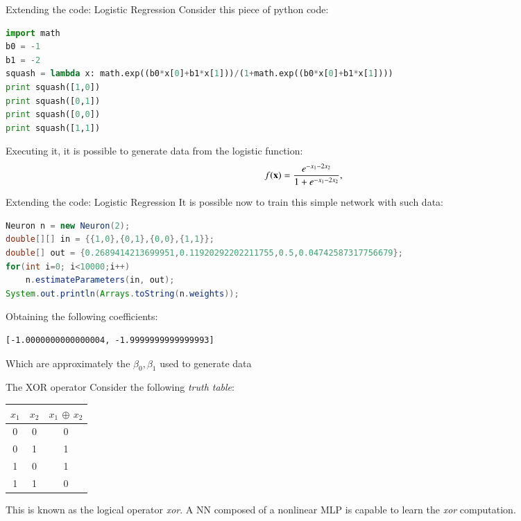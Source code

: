 \documentclass[xcolor ={table,usenames,dvipsnames}]{beamer}
\theoremstyle{definition}
\begin{document}
\begin{frame}[fragile]{Extending the code: Logistic Regression}
Consider this piece of python code:
\begin{lstlisting}[language=Python]
import math
b0 = -1
b1 = -2
squash = lambda x: math.exp((b0*x[0]+b1*x[1]))/(1+math.exp((b0*x[0]+b1*x[1])))
print squash([1,0])
print squash([0,1])
print squash([0,0])
print squash([1,1])
\end{lstlisting}
Executing it, it is possible to generate data from the logistic function:
$$
f(\textbf x) = \frac{e^{-x_1-2x_2}}{1+e^{-x_1-2x_2}},
$$
\end{frame}
\begin{frame}[fragile]{Extending the code: Logistic Regression}
It is possible now to train this simple network with such data:
\begin{lstlisting}[language=Java]
Neuron n = new Neuron(2);
double[][] in = {{1,0},{0,1},{0,0},{1,1}};
double[] out = {0.2689414213699951,0.11920292202211755,0.5,0.04742587317756679};
for(int i=0; i<10000;i++)
	n.estimateParameters(in, out);
System.out.println(Arrays.toString(n.weights));
\end{lstlisting}
Obtaining the following coefficients:
\begin{lstlisting}
[-1.0000000000000004, -1.9999999999999993]
\end{lstlisting}
Which are approximately the $\beta_0,\beta_1$ used to generate data
\end{frame}
\begin{frame}{The XOR operator}
Consider the following \emph{truth table}:
\begin{center}
	\begin{tabular}{|c|c|c|}
		\hline 
		$x_1$ & $x_2$ & $x_1$ $\oplus$ $x_2$ \\ 
		\hline 
		0 & 0 & 0 \\ 
		\hline 
		0 & 1 & 1 \\ 
		\hline 
		1 & 0 & 1 \\ 
		\hline 
		1 & 1 & 0 \\ 
		\hline 
	\end{tabular}
\end{center} 
This is known as the logical operator \textit{xor}. A NN composed of a nonlinear MLP is capable to learn the \textit{xor} computation.
\end{frame}
\end{document}
